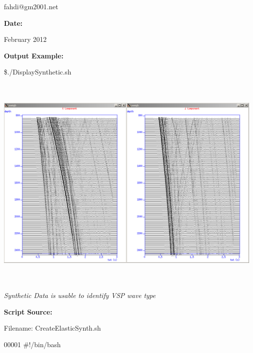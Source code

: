 \documentclass{article}
\begin{document}
\vspace{4pt}
\leftskip=18pt
fahdi@gm2001.net 

\vspace{4pt}
\leftskip=0pt
\textbf{Date:}

\vspace{4pt}
\leftskip=18pt
February 2012 

\vspace{16pt}
\leftskip=0pt
\textbf{Output Example:\pagebreak{}}

\vspace{4pt}
\$./DisplaySynthetic.sh

\vspace{4pt}
\includegraphics[width=467pt, height=305pt, keepaspectratio=true]{LatihanVSPsu-fig002.png}

\vspace{16pt}
\begin{center}
\textit{Synthetic Data is usable to identify VSP wave type\pagebreak{}}
\end{center}

\vspace{16pt}
\baselineskip=12pt
\leftskip=0pt
\textbf{Script Source:}

\vspace{4pt}
Filename: CreateElasticSynth.sh

\vspace{4pt}
00001 \#!/bin/bash
\end{document}
